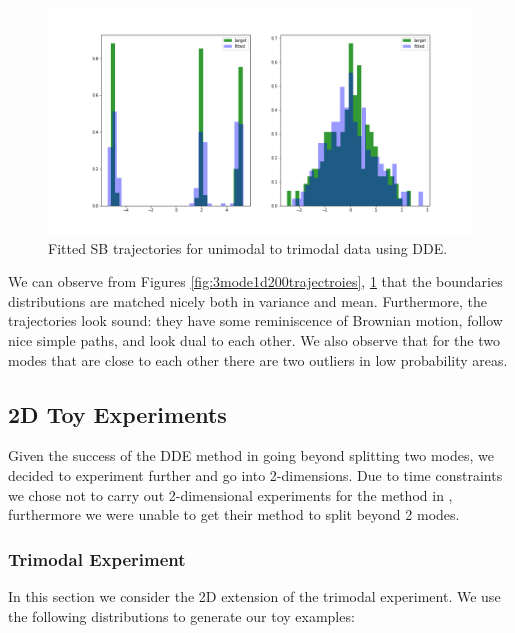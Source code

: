 \documentclass[a4paper,12pt,twoside,openright]{report}
\theoremstyle{definition}
\begin{document}
\begin{figure}
    \centering
    \includegraphics[scale=0.3,trim={2.3cm 1cm 2.5cm 0}, clip]{images/GP/gp_3_mode_200_boundaires.png}
    \caption{ Fitted SB trajectories for unimodal to trimodal data using DDE.  }
    \label{fig:3mode1d200boundaries}
\end{figure}
We can observe from Figures \ref{fig:3mode1d200trajectroies}, \ref{fig:3mode1d200boundaries} that the boundaries distributions are matched  nicely both in variance and mean. Furthermore, the trajectories look sound: they have some reminiscence of Brownian motion, follow nice simple paths, and look dual to each other. We also observe that for the two modes that are close to each other there are two outliers in low probability areas.
\subsection{2D Toy Experiments}

Given the success of the DDE method in going beyond splitting two modes, we decided to experiment further and go into 2-dimensions. Due to time constraints we chose not to carry out 2-dimensional experiments for the method in \cite{pavon2018data}, furthermore we were unable to get their method to split beyond 2 modes. 

\subsubsection{Trimodal Experiment}
In this section we consider the 2D extension of the trimodal experiment.   We use the following distributions to generate our toy examples:
\end{document}
